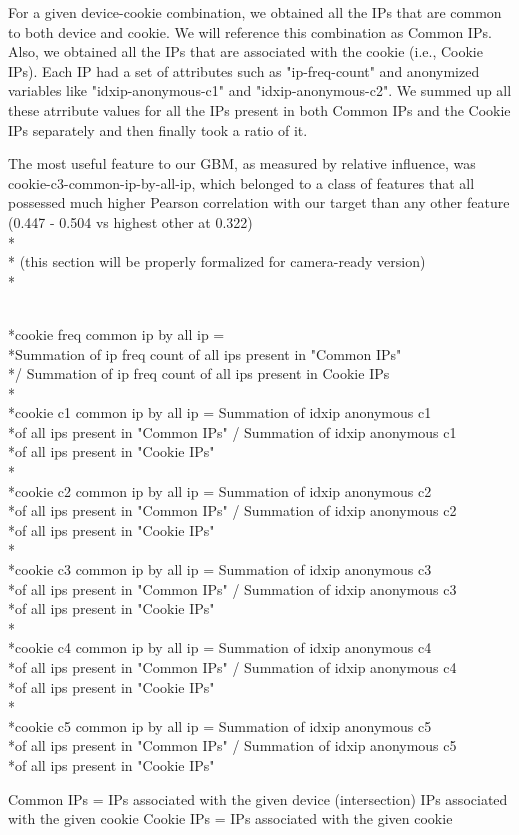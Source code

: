 \documentclass[9pt, journal]{IEEEtran}
\begin{document}
For a given device-cookie combination, we obtained all the IPs that are common to both device and cookie. We will reference this combination as Common IPs. 
Also, we obtained all the IPs that are associated with the cookie (i.e., Cookie IPs). 
Each IP had a set of attributes such as "ip-freq-count" and anonymized variables like "idxip-anonymous-c1" and "idxip-anonymous-c2". 
We summed up all these atrribute values for all the IPs present in both Common IPs and the Cookie IPs separately and then finally took a ratio of it.

The most useful feature to our GBM, as measured by relative influence, was cookie-c3-common-ip-by-all-ip, which belonged to a class of features that all possessed much higher Pearson correlation with our target than any other feature (0.447 - 0.504 vs highest other at 0.322)
\\*
\\* (this section will be properly formalized for camera-ready version)
\\*
\begin{footnotesize}
\\*cookie freq common ip by all ip = 
\\*Summation of ip freq count of all ips present in "Common IPs" 
\\*/ Summation of ip freq count of all ips present in Cookie IPs
\\*
\\*cookie c1 common ip by all ip = Summation of idxip anonymous c1 
\\*of all ips present in "Common IPs" / Summation of idxip anonymous c1 
\\*of all ips present in "Cookie IPs"
\\*
\\*cookie c2 common ip by all ip = Summation of idxip anonymous c2
\\*of all ips present in "Common IPs" / Summation of idxip anonymous c2
\\*of all ips present in "Cookie IPs"
\\*
\\*cookie c3 common ip by all ip = Summation of idxip anonymous c3
\\*of all ips present in "Common IPs" / Summation of idxip anonymous c3
\\*of all ips present in "Cookie IPs"
\\*
\\*cookie c4 common ip by all ip = Summation of idxip anonymous c4
\\*of all ips present in "Common IPs" / Summation of idxip anonymous c4 
\\*of all ips present in "Cookie IPs"
\\*
\\*cookie c5 common ip by all ip = Summation of idxip anonymous c5
\\*of all ips present in "Common IPs" / Summation of idxip anonymous c5
\\*of all ips present in "Cookie IPs"

Common IPs = IPs associated with the given device (intersection) IPs associated with the given cookie
Cookie IPs = IPs associated with the given cookie
\end{footnotesize}
\end{document}
